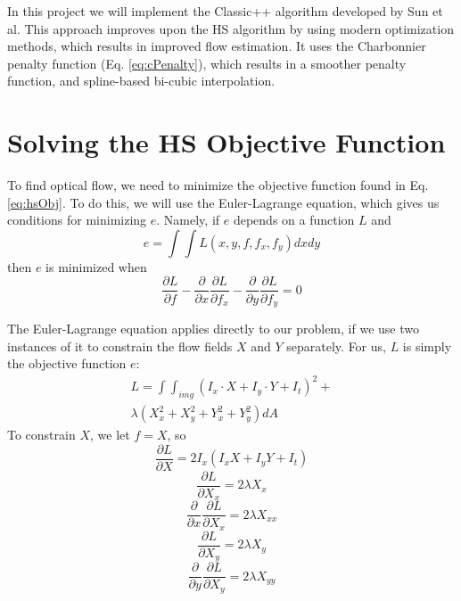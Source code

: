 \documentclass[10pt,twocolumn,letterpaper]{article}
\begin{document}
In this project we will implement the Classic++ algorithm developed by Sun et al. This approach improves upon the HS algorithm by using modern optimization methods, which results in improved flow estimation. It uses the Charbonnier penalty function (Eq. \ref{eq:cPenalty}), which results in a smoother penalty function, and spline-based bi-cubic interpolation.

\section{Solving the HS Objective Function}

To find optical flow, we need to minimize the objective function found in Eq. \ref{eq:hsObj}.  To do this, we will use the Euler-Lagrange equation, which gives us conditions for minimizing $e$.  Namely, if $e$ depends on a function $L$ and
\begin{equation} \label{eq:eulerL}
e = \int \int L(x, y, f, f_x, f_y) dxdy
\end{equation}
then $e$ is minimized when 
\begin{equation} \label{eq:eulerCondition}
\frac{\partial L}{\partial f} - \frac{\partial}{\partial x} \frac{\partial L}{\partial f_x} - \frac{\partial}{\partial y} \frac{\partial L}{\partial f_y} = 0
\end{equation}

The Euler-Lagrange equation applies directly to our problem, if we use two instances of it to constrain the flow fields $X$ and $Y$ separately.  For us, $L$ is simply the objective function $e$: 
\begin{multline} \label{eq:eulerL2}
L =  \int \int_{img} (I_x \cdot X + I_y \cdot Y + I_t)^2 + \\
\lambda ( X_x^2 + X_y^2 + Y_x^2 + Y_y^2 ) dA 
\end{multline}
To constrain $X$, we let $f=X$, so 
\begin{equation} \label{eq:eulerPlug1}
\frac{\partial L}{\partial X} = 2I_x (I_x X + I_y Y + I_t)
\end{equation}
\begin{equation} \label{eq:eulerPlug2}
\frac{\partial L}{\partial X_x} = 2 \lambda X_x
\end{equation}
\begin{equation} \label{eq:eulerPlug3}
\frac{\partial}{\partial x} \frac{\partial L}{\partial X_x} = 2 \lambda X_{xx}
\end{equation}
\begin{equation} \label{eq:eulerPlug4}
\frac{\partial L}{\partial X_y} = 2 \lambda X_y
\end{equation}
\begin{equation} \label{eq:eulerPlug5}
\frac{\partial}{\partial y} \frac{\partial L}{\partial X_y} = 2 \lambda X_{yy}
\end{equation}
\end{document}
